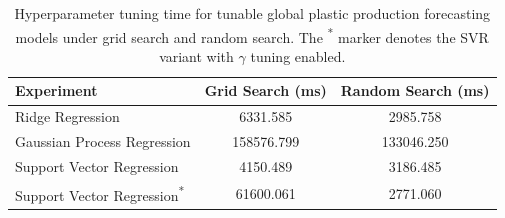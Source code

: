 \begin{table}[!ht]
	\centering
	\caption{
		\centering Hyperparameter tuning time for tunable global plastic production forecasting models under grid search and random search. The \textsuperscript{*} marker denotes the SVR variant with \(\gamma\) tuning enabled.
	}
	\begin{tabular}{@{}lcc@{}}
		\toprule
		\textbf{Experiment}                          & \textbf{Grid Search (ms)} & \textbf{Random Search (ms)} \\
		\midrule
		Ridge Regression                             & 6331.585                  & 2985.758                    \\
		Gaussian Process Regression                  & 158576.799                & 133046.250                  \\
		Support Vector Regression                    & 4150.489                  & 3186.485                    \\
		Support Vector Regression\textsuperscript{*} & 61600.061                 & 2771.060                    \\
		\hline
	\end{tabular}
	\label{tab:global_forecasting_tuning_time}
\end{table}
